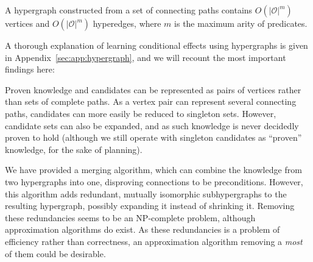 \documentclass[\master/Master.tex]{subfiles}
\begin{document}
A hypergraph constructed from a set of connecting paths contains $O\left(|\mathcal{O}|^m\right)$ vertices and $O\left( |\mathcal{O}|^m\right)$ hyperedges, where $m$ is the maximum arity of predicates. 

A thorough explanation of learning conditional effects using hypergraphs is given in Appendix~\ref{sec:app:hypergraph}, and we will recount the most important findings here:

Proven knowledge and candidates can be represented as pairs of vertices rather than sets of complete paths. As a vertex pair can represent several connecting paths, candidates can more easily be reduced to singleton sets. However, candidate sets can also be expanded, and as such knowledge is never decidedly proven to hold (although we still operate with singleton candidates as ``proven'' knowledge, for the sake of planning).

We have provided a merging algorithm, which can combine the knowledge from two hypergraphs into one, disproving connections to be preconditions. However, this algorithm adds redundant, mutually isomorphic subhypergraphs to the resulting hypergraph, possibly expanding it instead of shrinking it. Removing these redundancies seems to be an NP-complete problem, although approximation algorithms do exist. As these redundancies is a problem of efficiency rather than correctness, an approximation algorithm removing a \emph{most} of them could be desirable.
\end{document}
